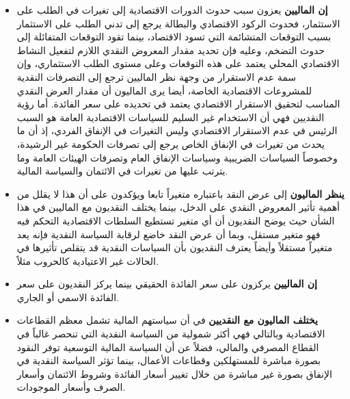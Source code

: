 \documentclass[10pt,a4paper]{report}
\begin{document}
\begin{doublespacing}
\begin{itemize}
	\item \textbf{إن الماليين} يعزون سبب حدوث الدورات الاقتصادية إلى تغيرات في الطلب على الاستثمار، فحدوث الركود الاقتصادي والبطالة يرجع إلى تدني الطلب على الاستثمار بسبب التوقعات المتشائمة التي تسود الاقتصاد، بينما تقود التوقعات المتفائلة إلى حدوث التضخم، وعليه فإن تحديد مقدار المعروض النقدي اللازم لتفعيل النشاط الاقتصادي المحلي يعتمد على هذه التوقعات وعلى مستوى الطلب الاستثماري، وإن سمة عدم الاستقرار من وجهة نظر الماليين ترجع إلى التصرفات النقدية للمشروعات الاقتصادية الخاصة، أيضا يرى الماليون أن مقدار العرض النقدي المناسب لتحقيق الاستقرار الاقتصادي يعتمد في تحديده على سعر الفائدة.
	أما رؤية النقديين فهي أن الاستخدام غير السليم للسياسات الاقتصادية العامة هو السبب الرئيس في عدم الاستقرار الاقتصادي وليس التغيرات في الإنفاق الفردي، إذ أن ما يحدث من تغيرات في الإنفاق الخاص يرجع إلى تصرفات الحكومة غير الرشيدة، وخصوصاً السياسات الضريبية وسياسات الإنفاق العام وتصرفات الهيئات العامة وما يترتب عليها من تغيرات في الائتمان والسياسة المالية.
	\item \textbf{ينظر الماليون} إلى عرض النقد باعتباره متغيراً تابعا ويؤكدون على أن هذا لا يقلل من أهمية تأثير المعروض النقدي على الدخل، بينما يختلف النقديون مع الماليين في هذا الشأن حيث يوضح النقديون أن أي متغير تستطيع السلطات الاقتصادية التحكم فيه فهو متغير مستقل، وبما أن عرض النقد خاضع لرقابة السياسة النقدية فإنه يعد متغيراً مستقلاً وأيضاً يعترف النقديون بأن السياسات النقدية قد يتقلص تأثيرها في الحالات غير الاعتيادية كالحروب مثلاً.
	\item \textbf{إن الماليين} يركزون على سعر الفائدة الحقيقي بينما يركز النقديون على سعر الفائدة الاسمي أو الجاري.
	\item \textbf{يختلف الماليون مع النقديين} في أن سياستهم المالية تشمل معظم القطاعات الاقتصادية وبالتالي فهي أكثر شمولية من السياسة النقدية التي تنحصر غالباً في القطاع المصرفي والمالي، فضلاً عن أن السياسة المالية التوسعية توفر النقود بصورة مباشرة للمستهلكين وقطاعات الأعمال، بينما تؤثر السياسة النقدية في الإنفاق بصورة غير مباشرة من خلال تغيير أسعار الفائدة وشروط الائتمان وأسعار الصرف وأسعار الموجودات.
\end{itemize}

\end{doublespacing}
\end{document}
